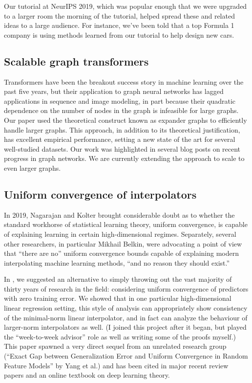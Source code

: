 \documentclass[12pt]{article}
\begin{document}
Our tutorial at NeurIPS 2019, which was popular enough that we were upgraded to a larger room the morning of the tutorial, helped spread these and related ideas to a large audience. For instance, we've been told that a top Formula 1 company is using methods learned from our tutorial to help design new cars.

\subsection{Scalable graph transformers} \label{sec:exphormers}
Transformers have been the breakout success story in machine learning over the past five years,
but their application to graph neural networks has lagged applications in sequence and image modeling,
in part because their quadratic dependence on the number of nodes in the graph
is infeasible for large graphs.
Our paper \cite{shirzad:exphormer} %
used the theoretical construct known as expander graphs
to efficiently handle larger graphs.
This approach, in addition to its theoretical justification,
has excellent empirical performance,
setting a new state of the art for several well-studied datasets.
Our work was highlighted in several blog posts on recent progress in graph networks.
We are currently extending the approach to scale to even larger graphs.

\subsection{Uniform convergence of interpolators} \label{sec:interpolators}
In 2019, Nagarajan and Kolter brought considerable doubt as to whether the standard workhorse of statistical learning theory, uniform convergence, is capable of explaining learning in certain high-dimensional regimes. Separately, several other researchers, in particular Mikhail Belkin, were advocating a point of view that ``there are no'' uniform convergence bounds capable of explaining modern interpolating machine learning methods, ``and no reason they should exist.''

In \cite{zhou:uniform-interpolation}, we suggested an alternative to simply throwing out the vast majority of thirty years of research in the field: considering uniform convergence of predictors with zero training error. We showed that in one particular high-dimensional linear regression setting, this style of analysis can appropriately show consistency of the minimal-norm linear interpolator, and in fact can analyze the behaviour of larger-norm interpolators as well. (I joined this project after it began, but played the ``week-to-week advisor'' role as well as writing some of the proofs myself.) This paper spawned a very direct sequel from an unrelated research group (``Exact Gap between Generalization Error and Uniform Convergence in Random Feature Models'' by Yang et al.) and has been cited in major recent review papers and an online textbook on deep learning theory.
\end{document}
